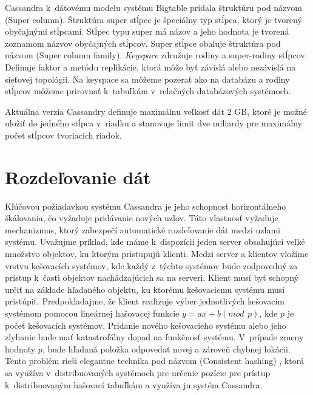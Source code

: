\documentclass[11pt,twoside,a4paper]{book}
\begin{document}
Cassandra k~dátovému modelu systému Bigtable pridala štruktúru pod názvom \emph{} (Super column). Štruktúra super stĺpec je špeciálny typ stĺpca, ktorý je tvorený obyčajnými stĺpcami. Stĺpec typu super má názov a jeho hodnota je tvorená zoznamom názvov obyčajných stĺpcov. Super stĺpce obaľuje štruktúra pod názvom \emph{} (Super column family). \emph{Keyspace} združuje rodiny a super-rodiny stĺpcov. Definuje faktor a metódu replikácie, ktorá môže byť závislá alebo nezávislá na sieťovej topológii. Na keyspace sa môžeme pozerať ako na databázu a rodiny stĺpcov môžeme prirovnať k~tabuľkám v~relačných databázových systémoch.

Aktuálna verzia Cassandry definuje maximálnu veľkosť dát 2 GB, ktoré je možné uložiť do jedného stĺpca v~riadku a stanovuje limit dve miliardy pre maximálny počet stĺpcov tvoriacich riadok.



\section{Rozdeľovanie dát}
Kľúčovou požiadavkou systému Cassandra je jeho schopnosť horizontálneho škálovania, čo vyžaduje pridávanie nových uzlov. Táto vlastnosť vyžaduje mechanizmus, ktorý zabezpečí automatické rozdeľovanie dát medzi uzlami systému. Uvažujme príklad, kde máme k~dispozícii jeden server obsahujúci veľké množstvo objektov, ku ktorým pristupujú klienti. Medzi server a klientov vložíme vrstvu kešovacích systémov, kde každý z~týchto systémov bude zodpovedný za prístup k~časti objektov nachádzajúcich sa na serveri. Klient musí byť schopný určiť na základe hľadaného objektu, ku ktorému kešovaciemu systému musí pristúpiť. Predpokladajme, že klient realizuje výber jednotlivých kešovacím systémom pomocou lineárnej hašovacej funkcie ${y = ax + b (mod\,\ p)}$, kde $p$ je počet kešovacích systémov. Pridanie nového kešovacieho systému alebo jeho zlyhanie bude mať katastrofálny dopad na funkčnosť systému. V~prípade zmeny hodnoty $p$, bude hľadaná položka odpovedať novej a zároveň chybnej lokácii. Tento problém rieši elegantne technika pod názvom \emph{} (Consistent hashing) \cite{Karger:1997:CHR:258533.258660}, ktorá sa využíva v~distribuovaných systémoch pre určenie pozície pre prístup k~distribuovaným hašovací tabuľkám a využíva ju systém Cassandra.
\end{document}

